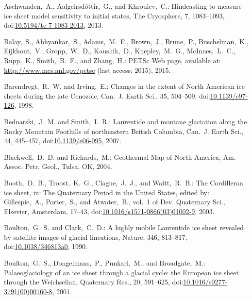 \documentclass[tc, manuscript]{copernicus}
\begin{document}
\begin{thebibliography}{114}
 Aschwanden,~A., A{\dh}algeirsd\'{o}ttir,~G., and Khroulev,~C.: Hindcasting to measure ice sheet model sensitivity to   initial states, The Cryosphere, 7, 1083--1093,
doi:\href{http://dx.doi.org/10.5194/tc-7-1083-2013}{10.5194/tc-7-1083-2013}, 2013.


Balay,~S., Abhyankar,~S., Adams,~M.~F., Brown,~J., Brune,~P., Buschelman,~K.,
Eijkhout,~V., Gropp,~W.~D., Kaushik,~D., Knepley,~M.~G., McInnes,~L.~C.,
Rupp,~K., Smith,~B.~F., and Zhang,~H.: {PETS}c {W}eb page, available at:
\url{http://www.mcs.anl.gov/petsc} (last access: 2015), 2015.


Barendregt,~R.~W. and Irving,~E.: Changes in the extent of North American ice sheets during the late Cenozoic, Can.~J. Earth Sci., 35, 504--509,
doi:\href{http://dx.doi.org/10.1139/e97-126}{10.1139/e97-126}, 1998.


Bednarski,~J.~M. and Smith,~I.~R.: Laurentide and montane glaciation along the Rocky Mountain Foothills of northeastern British Columbia, Can.~J. Earth Sci., 44, 445--457,
doi:\href{http://dx.doi.org/10.1139/e06-095}{10.1139/e06-095}, 2007.


Blackwell,~D.~D. and Richards,~M.: Geothermal Map of North America, Am. Assoc. Petr. Geol., Tulsa, OK, 2004.


Booth,~D.~B., Troost,~K.~G., Clague,~J.~J., and Waitt,~R.~B.: The Cordilleran ice sheet, in: The Quaternary Period in the United States, edited by: Gillespie,~A., Porter,~S., and Atwater,~B., vol.~1 of Dev. Quaternary Sci., Elsevier, Amsterdam, 17--43,
doi:\href{http://dx.doi.org/10.1016/s1571-0866(03)01002-9}{10.1016/s1571-0866(03)01002-9}, 2003.


Boulton,~G.~S. and Clark,~C.~D.: A highly mobile Laurentide ice sheet revealed by satellite images of glacial lineations, Nature, 346, 813--817,
doi:\href{http://dx.doi.org/10.1038/346813a0}{10.1038/346813a0}, 1990.


Boulton,~G.~S., Dongelmans,~P., Punkari,~M., and Broadgate,~M.: Palaeoglaciology of an ice sheet through a glacial cycle: the European ice sheet through the Weichselian, Quaternary Res., 20, 591--625,
doi:\href{http://dx.doi.org/10.1016/s0277-3791(00)00160-8}{10.1016/s0277-3791(00)00160-8}, 2001.



\end{thebibliography}
\end{document}
